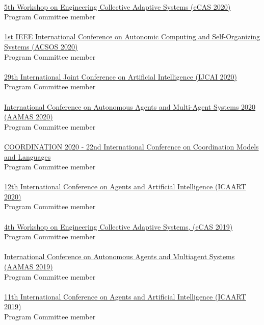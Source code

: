 \halfblankline \\
\href{http://archive.vn/wip/38Ah6}{5th Workshop on Engineering Collective Adaptive Systems (eCAS 2020)}
\\ Program Committee member \\
\halfblankline \\
\href{https://conf.researchr.org/home/acsos-2020}{1st IEEE International Conference on Autonomic Computing and Self-Organizing Systems (ACSOS 2020)}
\\ Program Committee member \\
\halfblankline \\
\href{https://https://ijcai20.org/}{29th International Joint Conference on Artificial Intelligence (IJCAI 2020)}
\\ Program Committee member \\
\halfblankline \\
\href{https://aamas2020.conference.auckland.ac.nz/program-committee-members/}{International Conference on Autonomous Agents and Multi-Agent Systems 2020 (AAMAS 2020)}
\\ Program Committee member \\
\halfblankline \\
\href{http://www.discotec.org/2020/coordination}{COORDINATION 2020 - 22nd International Conference on Coordination Models and Languages}
\\ Program Committee member \\
\halfblankline \\
\href{http://www.icaart.org/?y=2020}{12th International Conference on Agents and Artificial Intelligence 
(ICAART 2020)}
\\ Program Committee member \\
\halfblankline \\
\href{http://apice.unibo.it/xwiki/bin/view/ECAS2019/Committees}{4th Workshop on Engineering Collective Adaptive Systems, (eCAS 2019)}
\\ Program Committee member \\
\halfblankline \\
\href{http://aamas2019.encs.concordia.ca/}{International Conference on Autonomous Agents and 
Multiagent Systems (AAMAS 2019)}
\\ Program Committee member \\
\halfblankline \\
\href{http://www.icaart.org/?y=2019}{11th International Conference on Agents and Artificial Intelligence 
(ICAART 2019)}
\\ Program Committee member \\
